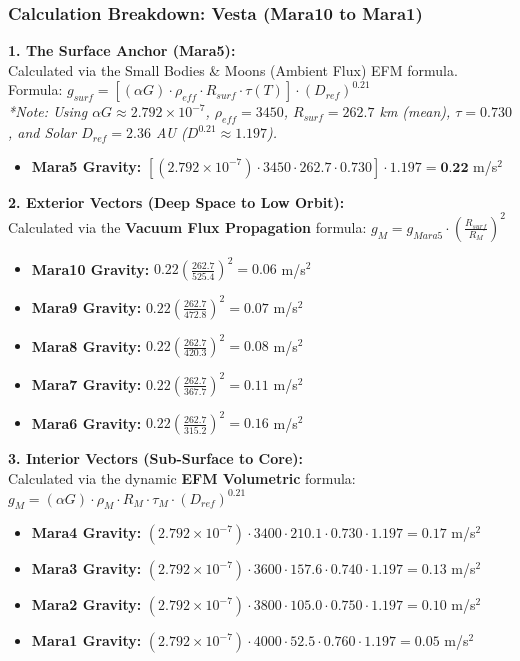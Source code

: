 \documentclass[11pt, a4paper]{article}
\begin{document}
\clearpage
\subsubsection{Calculation Breakdown: Vesta (Mara10 to Mara1)}

\noindent \textbf{1. The Surface Anchor (Mara5):} \\
Calculated via the Small Bodies \& Moons (Ambient Flux) EFM formula. \\
Formula: $g_{surf} = \left[ (\alpha G) \cdot \rho_{eff} \cdot R_{surf} \cdot \tau(T) \right] \cdot (D_{ref})^{0.21}$ \\
\textit{*Note: Using $\alpha G \approx 2.792 \times 10^{-7}$, $\rho_{eff} = 3450$, $R_{surf} = 262.7$ km (mean), $\tau = 0.730$, and Solar $D_{ref} = 2.36$ AU ($D^{0.21} \approx 1.197$).}
\begin{itemize}
  \item \textbf{Mara5 Gravity:} $\left[ (2.792 \times 10^{-7}) \cdot 3450 \cdot 262.7 \cdot 0.730 \right] \cdot 1.197 = \textbf{0.22}$ m/s$^2$
\end{itemize}

\vspace{0.5em}
\noindent \textbf{2. Exterior Vectors (Deep Space to Low Orbit):} \\
Calculated via the \textbf{Vacuum Flux Propagation} formula: $g_M = g_{Mara5} \cdot \left( \frac{R_{surf}}{R_M} \right)^2$
\begin{itemize}
  \item \textbf{Mara10 Gravity:} $0.22 \left( \frac{262.7}{525.4} \right)^2 = 0.06$ m/s$^2$
  \item \textbf{Mara9 Gravity:} $0.22 \left( \frac{262.7}{472.8} \right)^2 = 0.07$ m/s$^2$
  \item \textbf{Mara8 Gravity:} $0.22 \left( \frac{262.7}{420.3} \right)^2 = 0.08$ m/s$^2$
  \item \textbf{Mara7 Gravity:} $0.22 \left( \frac{262.7}{367.7} \right)^2 = 0.11$ m/s$^2$
  \item \textbf{Mara6 Gravity:} $0.22 \left( \frac{262.7}{315.2} \right)^2 = 0.16$ m/s$^2$
\end{itemize}

\vspace{0.5em}
\noindent \textbf{3. Interior Vectors (Sub-Surface to Core):} \\
Calculated via the dynamic \textbf{EFM Volumetric} formula: $g_M = (\alpha G) \cdot \rho_{M} \cdot R_M \cdot \tau_M \cdot (D_{ref})^{0.21}$
\begin{itemize}
  \item \textbf{Mara4 Gravity:} $(2.792 \times 10^{-7}) \cdot 3400 \cdot 210.1 \cdot 0.730 \cdot 1.197 = 0.17$ m/s$^2$
  \item \textbf{Mara3 Gravity:} $(2.792 \times 10^{-7}) \cdot 3600 \cdot 157.6 \cdot 0.740 \cdot 1.197 = 0.13$ m/s$^2$
  \item \textbf{Mara2 Gravity:} $(2.792 \times 10^{-7}) \cdot 3800 \cdot 105.0 \cdot 0.750 \cdot 1.197 = 0.10$ m/s$^2$
  \item \textbf{Mara1 Gravity:} $(2.792 \times 10^{-7}) \cdot 4000 \cdot 52.5 \cdot 0.760 \cdot 1.197 = 0.05$ m/s$^2$
\end{itemize}
\end{document}
